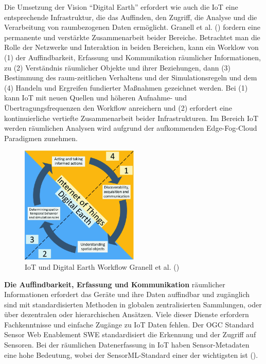 \documentclass[
  11pt,
  a4paperpaper,
  oneside, openany  ,captions=tableheading
]{scrbook}
\theoremstyle{definition}
\theoremstyle{remark}
\begin{document}
Die Umsetzung der Vision ``Digital Earth''
erfordert wie auch die IoT eine entsprechende Infrastruktur, die das
Auffinden, den Zugriff, die Analyse und die Verarbeitung von
raumbezogenen Daten ermöglicht. Granell et al.
() fordern eine permanente und
verstärkte Zusammenarbeit beider Bereiche. Betrachtet man die Rolle der
Netzwerke und Interaktion in beiden Bereichen, kann ein Worklow von (1)
der Auffindbarkeit, Erfassung und Kommunikation räumlicher
Informationen, zu (2) Verständnis räumlicher Objekte und ihrer
Beziehungen, dann (3) Bestimmung des raum-zeitlichen Verhaltens und der
Simulationsregeln und dem (4) Handeln und Ergreifen fundierter Maßnahmen
gezeichnet werden. Bei (1) kann IoT mit neuen Quellen und höheren
Aufnahme- und Übertragungsfrequenzen den Workflow anreichern und (2)
erfordert eine kontinuierliche vertiefte Zusammenarbeit beider
Infrastrukturen. Im Bereich IoT werden räumlichen Analysen wird aufgrund
der aufkommenden Edge-Fog-Cloud Paradigmen zunehmen.

\begin{figure}[H]

{\centering \includegraphics[width=0.5\textwidth,height=\textheight]{images/digital_earth_iot.png}

}

\caption{IoT und Digital Earth Workflow Granell et al.
()}

\end{figure}%

\textbf{Die Auffindbarkeit, Erfassung und Kommunikation} räumlicher
Informationen erfordert das Geräte und ihre Daten auffindbar und
zugänglich sind mit standardisierten Methoden in globalen
zentralisierten Sammlungen, oder über dezentralen oder hierarchischen
Ansätzen. Viele dieser Dienste erfordern Fachkenntnisse und einfache
Zugänge zu IoT Daten fehlen. Der OGC Standard Sensor Web Enablement SWE
standardisiert die Erkennung und der Zugriff auf Sensoren. Bei der
räumlichen Datenerfassung in IoT haben Sensor-Metadaten eine hohe
Bedeutung, wobei der SensorML-Standard einer der wichtigsten ist
().
\end{document}
